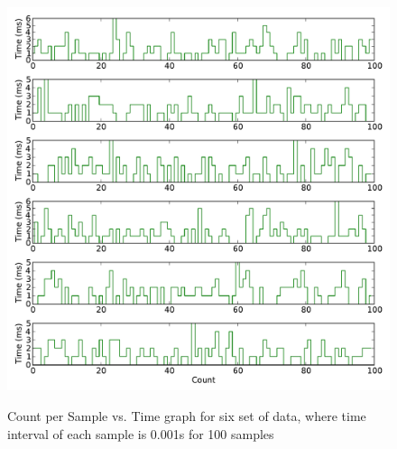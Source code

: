 \documentclass[a4paper,12pt]{article}
\begin{document}
\begin{figure}[H]
\centering
\includegraphics[angle=0,height=12cm,width=15.5cm]{graphs/task1.pdf}
\caption{Count per Sample vs. Time graph for six set of data, where time interval of each sample is 0.001s for 100 samples}
\label{fig:task1_plots}
\end{figure}
\end{document}
